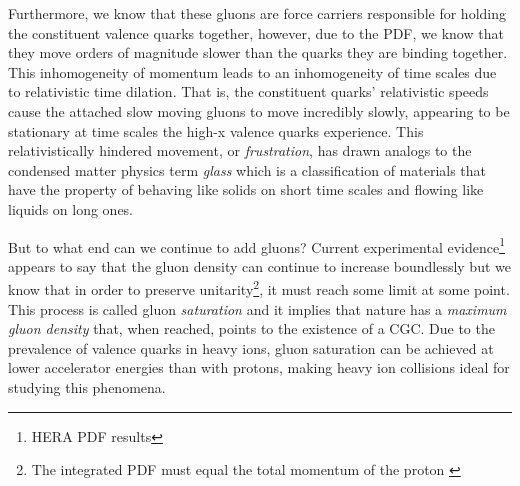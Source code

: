Furthermore, we know that these gluons are force carriers responsible for holding the constituent valence quarks together, however, due to the PDF, we know that they move orders of magnitude slower than the quarks they are binding together. This inhomogeneity of momentum leads to an inhomogeneity of time scales due to relativistic time dilation. That is, the constituent quarks' relativistic speeds cause the attached slow moving gluons to move incredibly slowly, appearing to be stationary at time scales the high-x valence quarks experience. This relativistically hindered movement, or \textit{frustration}, has drawn analogs to the condensed matter physics term \textit{glass} which is a classification of materials that have the property of behaving like solids on short time scales and flowing like liquids on long ones. 

But to what end can we continue to add gluons? Current experimental evidence\footnote{HERA PDF results} appears to say that the gluon density can continue to increase boundlessly but we know that in order to preserve unitarity\footnote{The integrated PDF must equal the total momentum of the proton \citep{HemmickRHIClecture}}, it must reach some limit at some point. This process is called gluon \textit{saturation} and it implies that nature has a \textit{maximum gluon density} that, when reached, points to the existence of a CGC\citep{HemmickRHIClecture}. Due to the prevalence of valence quarks in heavy ions, gluon saturation can be achieved at lower accelerator energies than with protons, making heavy ion collisions ideal for studying this phenomena.

